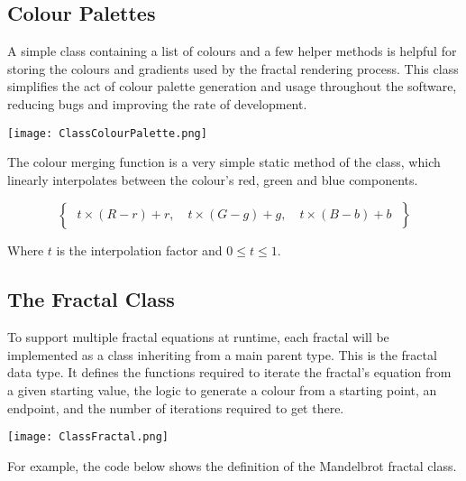 \subsection{Colour Palettes}

A simple class containing a list of colours and a few helper methods is helpful for storing the colours and gradients used by the fractal rendering process. This class simplifies the act of colour palette generation and usage throughout the software, reducing bugs and improving the rate of development.

\FloatBarrier
\begin{figure*}[htp]
    \centering
    \texttt{[image: ClassColourPalette.png]}
\end{figure*}
\FloatBarrier

The colour merging function is a very simple static method of the class, which linearly interpolates between the colour's red, green and blue components.

\begin{equation}
    \left\{ \phantom{\frac{a}{b}} t \times (R-r) + r, \quad t \times (G-g) + g, \quad t \times (B-b) + b \phantom{\frac{a}{b}} \right\}
\end{equation}

Where $t$ is the interpolation factor and $0 \le t \le 1$.

\subsection{The Fractal Class}

To support multiple fractal equations at runtime, each fractal will be implemented as a class inheriting from a main parent type. This is the fractal data type. It defines the functions required to iterate the fractal's equation from a given starting value, the logic to generate a colour from a starting point, an endpoint, and the number of iterations required to get there.

\FloatBarrier
\begin{figure*}[htp]
    \centering
    \texttt{[image: ClassFractal.png]}
\end{figure*}
\FloatBarrier

\vspace{0.5cm}
\noindent
For example, the code below shows the definition of the Mandelbrot fractal class.

